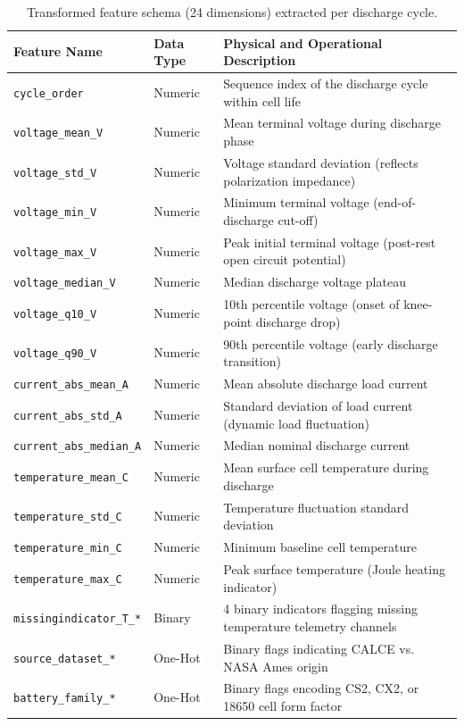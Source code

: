 \documentclass[a4paper,fleqn]{cas-sc}
\begin{document}
\begin{table}[pos=htbp]
\centering
\caption{Transformed feature schema (24 dimensions) extracted per discharge cycle.}
\label{tab:feature_schema}
\small
\renewcommand{\arraystretch}{1.15}
\begin{tabular}{llp{9.5cm}}
\toprule
\textbf{Feature Name} & \textbf{Data Type} & \textbf{Physical and Operational Description} \\
\midrule
\texttt{cycle\_order} & Numeric & Sequence index of the discharge cycle within cell life \\
\texttt{voltage\_mean\_V} & Numeric & Mean terminal voltage during discharge phase \\
\texttt{voltage\_std\_V} & Numeric & Voltage standard deviation (reflects polarization impedance) \\
\texttt{voltage\_min\_V} & Numeric & Minimum terminal voltage (end-of-discharge cut-off) \\
\texttt{voltage\_max\_V} & Numeric & Peak initial terminal voltage (post-rest open circuit potential) \\
\texttt{voltage\_median\_V} & Numeric & Median discharge voltage plateau \\
\texttt{voltage\_q10\_V} & Numeric & 10th percentile voltage (onset of knee-point discharge drop) \\
\texttt{voltage\_q90\_V} & Numeric & 90th percentile voltage (early discharge transition) \\
\texttt{current\_abs\_mean\_A} & Numeric & Mean absolute discharge load current \\
\texttt{current\_abs\_std\_A} & Numeric & Standard deviation of load current (dynamic load fluctuation) \\
\texttt{current\_abs\_median\_A} & Numeric & Median nominal discharge current \\
\texttt{temperature\_mean\_C} & Numeric & Mean surface cell temperature during discharge \\
\texttt{temperature\_std\_C} & Numeric & Temperature fluctuation standard deviation \\
\texttt{temperature\_min\_C} & Numeric & Minimum baseline cell temperature \\
\texttt{temperature\_max\_C} & Numeric & Peak surface temperature (Joule heating indicator) \\
\texttt{missingindicator\_T\_*} & Binary & 4 binary indicators flagging missing temperature telemetry channels \\
\texttt{source\_dataset\_*} & One-Hot & Binary flags indicating CALCE vs. NASA Ames origin \\
\texttt{battery\_family\_*} & One-Hot & Binary flags encoding CS2, CX2, or 18650 cell form factor \\
\bottomrule
\end{tabular}
\end{table}
\end{document}
